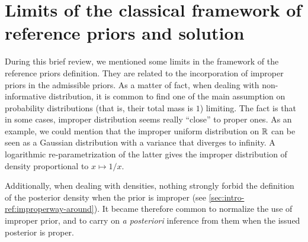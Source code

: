 















\section{Limits of the classical framework of reference priors and solution}\label{sec:intro-refs:limits}



During this brief review, we mentioned some limits in the framework of the reference priors definition.
They are related to the incorporation of improper priors in the admissible priors. As a matter of fact, when dealing with non-informative distribution, it is common to find one of the main assumption on probability distributions (that is, their total mass is $1$) limiting.
The fact is that in some cases, improper distribution seems really ``close'' to proper ones.
As an example, we could mention that the improper uniform distribution on $\mathbb{R}$ can be seen as a Gaussian distribution with a variance that diverges to infinity. A logarithmic re-parametrization of the latter gives the improper distribution of density proportional to $x\mapsto1/x$.

Additionally, when dealing with densities, nothing strongly forbid the definition of the posterior density when the prior is improper (see \cref{sec:intro-ref:improperway-around}). It became therefore common to normalize the use of improper prior, and to carry on \emph{a posteriori} inference from them when the issued posterior is proper.

